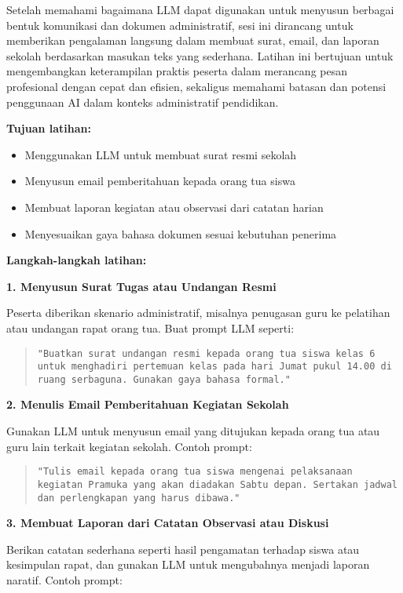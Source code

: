 Setelah memahami bagaimana LLM dapat digunakan untuk menyusun berbagai bentuk komunikasi dan dokumen administratif, sesi ini dirancang untuk memberikan pengalaman langsung dalam membuat surat, email, dan laporan sekolah berdasarkan masukan teks yang sederhana. Latihan ini bertujuan untuk mengembangkan keterampilan praktis peserta dalam merancang pesan profesional dengan cepat dan efisien, sekaligus memahami batasan dan potensi penggunaan AI dalam konteks administratif pendidikan.

\textbf{Tujuan latihan:}
\begin{itemize}
	\item Menggunakan LLM untuk membuat surat resmi sekolah
	\item Menyusun email pemberitahuan kepada orang tua siswa
	\item Membuat laporan kegiatan atau observasi dari catatan harian
	\item Menyesuaikan gaya bahasa dokumen sesuai kebutuhan penerima
\end{itemize}

\textbf{Langkah-langkah latihan:}

\textbf{1. Menyusun Surat Tugas atau Undangan Resmi}

Peserta diberikan skenario administratif, misalnya penugasan guru ke pelatihan atau undangan rapat orang tua. Buat prompt LLM seperti:

\begin{quote}
	\centering
	\texttt{"Buatkan surat undangan resmi kepada orang tua siswa kelas 6 untuk menghadiri pertemuan kelas pada hari Jumat pukul 14.00 di ruang serbaguna. Gunakan gaya bahasa formal."}
\end{quote}

\textbf{2. Menulis Email Pemberitahuan Kegiatan Sekolah}

Gunakan LLM untuk menyusun email yang ditujukan kepada orang tua atau guru lain terkait kegiatan sekolah. Contoh prompt:

\begin{quote}
	\centering
	\texttt{"Tulis email kepada orang tua siswa mengenai pelaksanaan kegiatan Pramuka yang akan diadakan Sabtu depan. Sertakan jadwal dan perlengkapan yang harus dibawa."}
\end{quote}

\textbf{3. Membuat Laporan dari Catatan Observasi atau Diskusi}

Berikan catatan sederhana seperti hasil pengamatan terhadap siswa atau kesimpulan rapat, dan gunakan LLM untuk mengubahnya menjadi laporan naratif. Contoh prompt:

